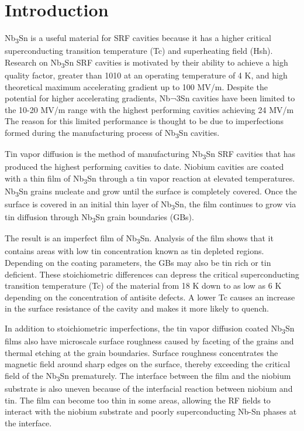 
\section{Introduction}

Nb\textsubscript{3}Sn is a useful material for SRF cavities because it has a higher critical superconducting transition temperature (Tc) and superheating field (Hsh). Research on Nb\textsubscript{3}Sn SRF cavities is motivated by their ability to achieve a high quality factor, greater than 1010 at an operating temperature of 4 K, and high theoretical maximum accelerating gradient up to 100 MV/m. Despite the potential for higher accelerating gradients, Nb¬3Sn cavities have been limited to the 10-20 MV/m range with the highest performing cavities achieving 24 MV/m\cite{posen2021advances} The reason for this limited performance is thought to be due to imperfections formed during the manufacturing process of Nb\textsubscript{3}Sn cavities. 

Tin vapor diffusion is the method of manufacturing Nb\textsubscript{3}Sn SRF cavities that has produced the highest performing cavities to date. Niobium cavities are coated with a thin film of Nb\textsubscript{3}Sn through a tin vapor reaction at elevated temperatures\cite{posen2021advances,pudasaini2019growth}. Nb\textsubscript{3}Sn grains nucleate and grow until the surface is completely covered. Once the surface is covered in an initial thin layer of Nb\textsubscript{3}Sn, the film continues to grow via tin diffusion through Nb\textsubscript{3}Sn grain boundaries (GBs)\cite{pudasaini2019growth}. 

The result is an imperfect film of Nb\textsubscript{3}Sn. Analysis of the film shows that it contains areas with low tin concentration known as tin depleted regions\cite{lee2018atomic}. Depending on the coating parameters, the GBs may also be tin rich or tin deficient\cite{lee2020grain}. These stoichiometric differences can depress the critical superconducting transition temperature (Tc) of the material from 18 K down to as low as 6 K depending on the concentration of antisite defects\cite{sitaraman2021effect}. A lower Tc causes an increase in the surface resistance of the cavity and makes it more likely to quench.

In addition to stoichiometric imperfections, the tin vapor diffusion coated Nb\textsubscript{3}Sn films also have microscale surface roughness caused by faceting of the grains and thermal etching at the grain boundaries. Surface roughness concentrates the magnetic field around sharp edges on the surface, thereby exceeding the critical field of the Nb\textsubscript{3}Sn prematurely\cite{porter2016surface}. The interface between the film and the niobium substrate is also uneven because of the interfacial reaction between niobium and tin\cite{lee2018atomic}. The film can become too thin in some areas, allowing the RF fields to interact with the niobium substrate and poorly superconducting Nb-Sn phases at the interface.

